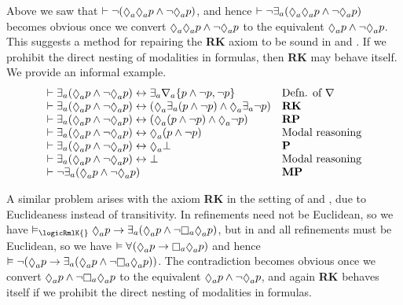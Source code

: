Above we saw that $\proves \lnot (\possibleA \possibleA \atomP \land \lnot \possibleA \atomP)$, and hence $\proves \lnot \somerefsA (\possibleA \possibleA \atomP \land \lnot \possibleA \atomP)$ becomes obvious once we convert $\possibleA \possibleA \atomP \land \lnot \possibleA \atomP$ to the equivalent $\possibleA \atomP \land \lnot \possibleA \atomP$.
This suggests a method for repairing the {\bf RK} axiom to be sound in \logicRmlKFF{} and \logicRmlKD{}.
If we prohibit the direct nesting of modalities in formulas, then {\bf RK} may behave itself.
We provide an informal example.
$$
\begin{array}{ll}
    \proves \somerefsA (\possibleA \atomP \land \lnot \possibleA \atomP) \iff \somerefsA \coversA \{\atomP \land \lnot \atomP, \lnot \atomP\} & \text{Defn. of $\covers$}\\
    \proves \somerefsA (\possibleA \atomP \land \lnot \possibleA \atomP) \iff (\possibleA \somerefsA (\atomP \land \lnot \atomP) \land \possibleA \somerefsA \lnot \atomP) & {\bf RK}\\ 
    \proves \somerefsA (\possibleA \atomP \land \lnot \possibleA \atomP) \iff (\possibleA (\atomP \land \lnot \atomP) \land \possibleA \lnot \atomP) & {\bf RP}\\ 
    \proves \somerefsA (\possibleA \atomP \land \lnot \possibleA \atomP) \iff \possibleA (\atomP \land \lnot \atomP) & \text{Modal reasoning}\\ 
    \proves \somerefsA (\possibleA \atomP \land \lnot \possibleA \atomP) \iff \possibleA \bot & {\bf P}\\ 
    \proves \somerefsA (\possibleA \atomP \land \lnot \possibleA \atomP) \iff \bot & \text{Modal reasoning}\\ 
    \proves \lnot \somerefsA (\possibleA \atomP \land \lnot \possibleA \atomP) & {\bf MP}\\ 
\end{array}
$$

A similar problem arises with the axiom {\bf RK} in the setting of \logicRmlKFF{} and \logicRmlKD{}, due to Euclideaness instead of transitivity.
In \logicRmlK{} refinements need not be Euclidean, so we have $\entails_\logicRmlK{} \possibleA \atomP \implies \somerefsA (\possibleA \atomP \land \lnot \necessaryA \possibleA \atomP)$, but in \logicRmlKFF{} and \logicRmlKD{} all refinements must be Euclidean, so we have $\entails \allrefs (\possibleA \atomP \implies \necessaryA \possibleA \atomP)$ and hence $\entails \lnot (\possibleA \atomP \implies \somerefsA (\possibleA \atomP \land \lnot \necessaryA \possibleA \atomP))$.
The contradiction becomes obvious once we convert $\possibleA \atomP \land \lnot \necessaryA \possibleA \atomP$ to the equivalent $\possibleA \atomP \land \lnot \possibleA \atomP$, and again {\bf RK} behaves itself if we prohibit the direct nesting of modalities in formulas.

